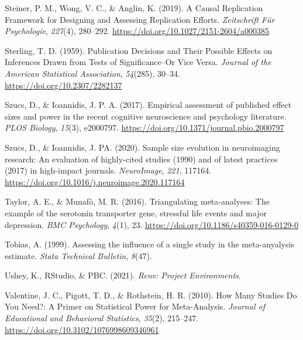 \documentclass[
  man,floatsintext]{apa6}
\newlength{\cslhangindent}
\newlength{\cslentryspacingunit} %
\newenvironment{CSLReferences}[2] %
 {%
  \setlength{\parindent}{0pt}
  \ifodd #1
  \let\oldpar\par
  \def\par{\hangindent=\cslhangindent\oldpar}
  \fi
  \setlength{\parskip}{#2\cslentryspacingunit}
 }%
 {}
\begin{document}
\begin{CSLReferences}{1}{0}
\leavevmode{}%
Steiner, P. M., Wong, V. C., \& Anglin, K. (2019). A {Causal Replication Framework} for {Designing} and {Assessing Replication Efforts}. \emph{Zeitschrift Für Psychologie}, \emph{227}(4), 280--292. \url{https://doi.org/10.1027/2151-2604/a000385}

\leavevmode{}%
Sterling, T. D. (1959). Publication {Decisions} and {Their Possible Effects} on {Inferences Drawn} from {Tests} of {Significance--Or Vice Versa}. \emph{Journal of the American Statistical Association}, \emph{54}(285), 30--34. \url{https://doi.org/10.2307/2282137}

\leavevmode{}%
Szucs, D., \& Ioannidis, J. P. A. (2017). Empirical assessment of published effect sizes and power in the recent cognitive neuroscience and psychology literature. \emph{PLOS Biology}, \emph{15}(3), e2000797. \url{https://doi.org/10.1371/journal.pbio.2000797}

\leavevmode{}%
Szucs, D., \& Ioannidis, J. PA. (2020). Sample size evolution in neuroimaging research: {An} evaluation of highly-cited studies (1990) and of latest practices (2017) in high-impact journals. \emph{NeuroImage}, \emph{221}, 117164. \url{https://doi.org/10.1016/j.neuroimage.2020.117164}

\leavevmode{}%
Taylor, A. E., \& Munafò, M. R. (2016). Triangulating meta-analyses: The example of the serotonin transporter gene, stressful life events and major depression. \emph{BMC Psychology}, \emph{4}(1), 23. \url{https://doi.org/10.1186/s40359-016-0129-0}

\leavevmode{}%
Tobias, A. (1999). Assessing the influence of a single study in the meta-anyalysis estimate. \emph{Stata Technical Bulletin}, \emph{8}(47).

\leavevmode{}%
Ushey, K., RStudio, \& PBC. (2021). \emph{Renv: {Project Environments}}.

\leavevmode{}%
Valentine, J. C., Pigott, T. D., \& Rothstein, H. R. (2010). How {Many Studies Do You Need}?: {A Primer} on {Statistical Power} for {Meta-Analysis}. \emph{Journal of Educational and Behavioral Statistics}, \emph{35}(2), 215--247. \url{https://doi.org/10.3102/1076998609346961}


\end{CSLReferences}
\end{document}
